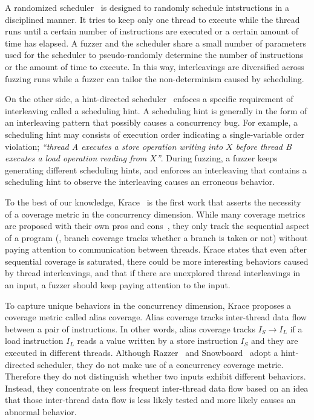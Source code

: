 A randomized scheduler~\cite{ski, pctalgorithm, krace, sparsernr} is
designed to randomly schedule intstructions in a disciplined
manner. It tries to keep only one thread to execute while the thread
runs until a certain number of instructions are executed or a certain
amount of time has elapsed.
%
A fuzzer and the scheduler share a small number of parameters used for
the scheduler to pseudo-randomly determine the number of instructions
or the amount of time to execute.
%
In this way, interleavings are diversified across fuzzing runs while a
fuzzer can tailor the non-determinism caused by scheduling.

On the other side, a hint-directed scheduler~\cite{razzer, snowboard}
enfoces a specific requirement of interleaving called a scheduling
hint.
%
A scheduling hint is generally in the form of an interleaving pattern
that possibly causes a concurrency bug. For example, a scheduling hint
may consists of execution order indicating a single-variable order
violation; \textit{``thread A executes a store operation writing into
  $X$ before thread B executes a load operation reading from $X$''}.
%
During fuzzing, a fuzzer keeps generating different scheduling hints,
and enforces an interleaving that contains a scheduling hint to
observe the interleaving causes an erroneous behavior.


%
To the best of our knowledge, Krace~\cite{krace} is the first work
that asserts the necessity of a coverage metric in the concurrency
dimension.
%
While many coverage metrics are proposed with their own pros and
cons~\cite{wang2019sensitive}, they only track the sequential aspect
of a program (\eg, branch coverage tracks whether a branch is taken or
not) without paying attention to communication between threads.
%
Krace states that even after sequential coverage is saturated, there
could be more interesting behaviors caused by thread interleavings,
and that if there are unexplored thread interleavings in an input, a
fuzzer should keep paying attention to the input.

To capture unique behaviors in the concurrency dimension, Krace
proposes a coverage metric called alias coverage.
%
Alias coverage tracks inter-thread data flow between a pair of
instructions. In other words, alias coverage tracks
\texttt{$I_S \rightarrow I_L$} if a load instruction \texttt{$I_L$}
reads a value written by a store instruction \texttt{$I_S$} and they
are executed in different threads.
%
%
%
Although Razzer~\cite{razzer} and Snowboard~\cite{snowboard} adopt a
hint-directed scheduler, they do not make use of a concurrency
coverage metric. Therefore they do not distinguish whether two inputs
exhibit different behaviors. Instead, they concentrate on less
frequent inter-thread data flow based on an idea that those
inter-thread data flow is less likely tested and more likely causes an
abnormal behavior.

